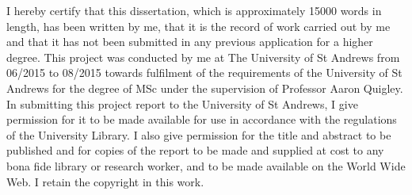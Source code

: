 I hereby certify that this dissertation, which is approximately 15000 words in length, has been written by me, that it is the record of work carried out by me and that it has not been submitted in any previous application for a higher degree. This project was conducted by me at The University of St Andrews from 06/2015 to 08/2015 towards fulfilment of the requirements of the University of St Andrews for the degree of MSc under the supervision of Professor Aaron Quigley.
In submitting this project report to the University of St Andrews, I give permission for it to be made available for use in accordance with the regulations of the University Library. I also give permission for the title and abstract to be published and for copies of the report to be made and supplied at cost to any bona fide library or research worker, and to be made available on the World Wide Web. I retain the copyright in this work.
